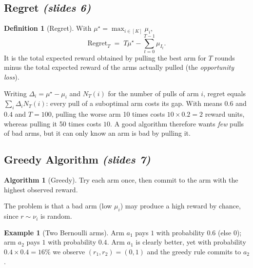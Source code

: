 \documentclass[11pt,a4paper]{article}
\newcommand{\Reg}{\mathrm{Regret}}
\newcommand{\slides}[1]{\emph{(slides #1)}}
\theoremstyle{plain}
\theoremstyle{definition}
\newtheorem{definition}[theorem]{Definition}
\newtheorem{example}[theorem]{Example}
\newtheorem{algorithm}[theorem]{Algorithm}
\theoremstyle{remark}
\begin{document}
\subsection{Regret \slides{6}}

\begin{definition}[Regret]
With $\mu^\star=\max_{i\in[K]}\mu_i$,
\[
  \Reg_T \;=\; T\mu^\star-\sum_{t=0}^{T-1}\mu_{I_t}.
\]
It is the total expected reward obtained by pulling the best arm for $T$ rounds minus the total expected reward of
the arms actually pulled (the \emph{opportunity loss}).
\end{definition}

\begin{intuition}
Writing $\Delta_i=\mu^\star-\mu_i$ and $N_T(i)$ for the number of pulls of arm $i$, regret equals
$\sum_i \Delta_i N_T(i)$: every pull of a suboptimal arm costs its gap. With means $0.6$ and $0.4$ and $T=100$,
pulling the worse arm 10 times costs $10\times0.2=2$ reward units, whereas pulling it 50 times costs $10$.
A good algorithm therefore wants \emph{few} pulls of bad arms, but it can only know an arm is bad by pulling it.
\end{intuition}

\subsection{Greedy Algorithm \slides{7}}

\begin{algorithm}[Greedy]
Try each arm once, then commit to the arm with the highest observed reward.
\end{algorithm}

The problem is that a bad arm (low $\mu_i$) may produce a high reward by chance, since $r\sim\nu_i$ is random.

\begin{example}[Two Bernoulli arms]
Arm $a_1$ pays $1$ with probability $0.6$ (else $0$); arm $a_2$ pays $1$ with probability $0.4$. Arm $a_1$ is
clearly better, yet with probability $0.4\times0.4=16\%$ we observe $(r_1,r_2)=(0,1)$ and the greedy rule commits to $a_2$.
\end{example}
\end{document}
